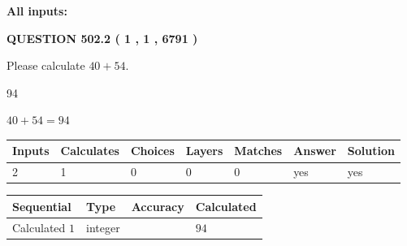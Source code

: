 \documentclass[12pt]{article}
\begin{document}
   
   
   
\noindent{}
   
   
   
   
\noindent\vspace{0.1in}\hspace{-0.08in} {\textbf{\Large{All inputs: }}}
   
   
  
\vspace{0.2in}
  
{\textbf{\Large{QUESTION
502.2 
 ( 1 , 1 , 6791 )
}}}
  
  
 
Please calculate $ %
40 +  %
54 $.
 
 
 
\noindent{}
 
 

94
 
 
\noindent{}
 
 

 
 
 
\noindent{}
 
 

$ %
40 +  %
54=   %
94$
 
 
\noindent{}
 
 

 
   
   
   
   
\noindent\begin{tabular}{|l|l|l|l|l|l|l|}
 \hline
Inputs & Calculates & Choices & Layers & Matches & Answer & Solution \\ \hline
 2  & 
 1  & 
 0
  & 
 0  & 
 0  & 
  yes & 
  yes 
  \\ \hline
 \end{tabular}
   
   
   
   
\noindent{}
   
   
  
  
\noindent\begin{tabular}{|l|l|l|l|}
\hline
 Sequential & Type & Accuracy & Calculated \\ 
\hline
 
 
  Calculated $  1 $ & integer &  & 
  $ 94 $ 
 \\  \hline  
 \end{tabular}
   
\end{document}
